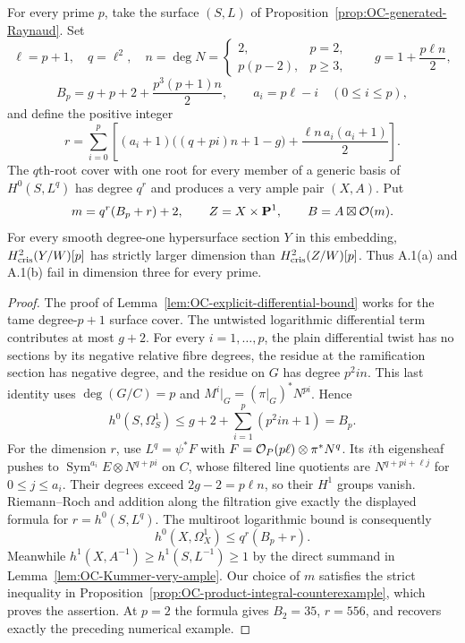 \begin{corollary}
\label{cor:OC-all-prime-integral-counterexample}
For every prime $p$, take the surface $(S,L)$ of
Proposition~\ref{prop:OC-generated-Raynaud}.  Set
\[
 \ell=p+1,\quad q=\ell^2,\quad
 n=\deg N=\begin{cases}2,&p=2,\\p(p-2),&p\geq3,\end{cases}
 \qquad g=1+\frac{p\ell n}{2},
\]
\[
 B_p=g+p+2+\frac{p^3(p+1)n}{2},
 \qquad a_i=p\ell-i\quad(0\leq i\leq p),
\]
and define the positive integer
\[
 r=\sum_{i=0}^p\left[
 (a_i+1)\bigl((q+pi)n+1-g\bigr)
     +\frac{\ell n\,a_i(a_i+1)}2\right].
\]
The $q$th-root cover with one root for every member of a generic basis of
$H^0(S,L^q)$ has degree $q^r$ and produces a very ample pair $(X,A)$.
Put
\[
           m=q^r(B_p+r)+2,\qquad Z=X\times\mathbf P^1,
           \qquad B=A\boxtimes\mathcal O(m).
\]
For every smooth degree-one hypersurface section $Y$ in this embedding,
$H^2_{\mathrm{cris}}(Y/W)[p]$ has strictly larger dimension than
$H^2_{\mathrm{cris}}(Z/W)[p]$.
Thus A.1(a) and A.1(b) fail in dimension three for every prime.
\end{corollary}
\begin{proof}
The proof of Lemma~\ref{lem:OC-explicit-differential-bound} works for the tame degree-$p+1$ surface cover.  The untwisted logarithmic differential term contributes at most $g+2$.  For every $i=1,\ldots,p$, the plain differential twist has no sections by its negative relative fibre degrees, the residue at the ramification section has negative degree, and the residue on $G$ has degree $p^2in$.  This last identity uses $\deg(G/C)=p$ and $M^i|_G=(\pi|_G)^*N^{pi}$.  Hence
\[
 h^0(S,\Omega_S^1)
 \leq g+2+\sum_{i=1}^p(p^2in+1)=B_p.
\]
For the dimension $r$, use $L^q=\psi^*F$ with
$F=\mathcal O_P(p\ell)\otimes\pi^*N^q$.
Its $i$th eigensheaf pushes to
$\operatorname{Sym}^{a_i}E\otimes N^{q+pi}$ on $C$, whose filtered line quotients are $N^{q+pi+\ell j}$ for $0\leq j\leq a_i$.
Their degrees exceed $2g-2=p\ell n$, so their $H^1$ groups vanish.  Riemann--Roch and addition along the filtration give exactly the displayed formula for $r=h^0(S,L^q)$.
The multiroot logarithmic bound is consequently
\[
                         h^0(X,\Omega_X^1)\leq q^r(B_p+r).
\]
Meanwhile $h^1(X,A^{-1})\geq h^1(S,L^{-1})\geq1$ by the direct summand in Lemma~\ref{lem:OC-Kummer-very-ample}.
Our choice of $m$ satisfies the strict inequality in
Proposition~\ref{prop:OC-product-integral-counterexample}, which proves the assertion.
At $p=2$ the formula gives $B_2=35$, $r=556$, and recovers exactly the preceding numerical example.
\end{proof}

